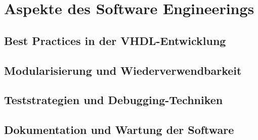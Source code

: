 \chapter{Aspekte des Software Engineerings}
\section{Best Practices in der VHDL-Entwicklung}
\section{Modularisierung und Wiederverwendbarkeit}
\section{Teststrategien und Debugging-Techniken}
\section{Dokumentation und Wartung der Software}